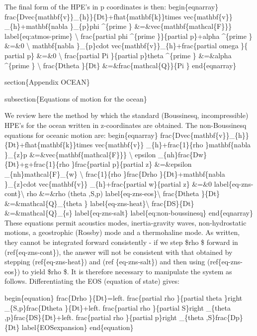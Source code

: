 \documentclass[letterpaper,10pt,english]{sphinxmanual}
\begin{document}
The final form of the HPE's in p coordinates is then:
begin\{eqnarray\}
frac\{Dvec\{mathbf\{v\}\}\_\{h\}\}\{Dt\}+fhat\{mathbf\{k\}\}times vec\{mathbf\{v\}\}
\_\{h\}+mathbf\{nabla \}\_\{p\}phi \textasciicircum{}\{prime \} \&=\&vec\{mathbf\{mathcal\{F\}\}\}
label\{eq:atmos-prime\} \textbackslash{}
frac\{partial phi \textasciicircum{}\{prime \}\}\{partial p\}+alpha \textasciicircum{}\{prime \} \&=\&0 \textbackslash{}
mathbf\{nabla \}\_\{p\}cdot vec\{mathbf\{v\}\}\_\{h\}+frac\{partial omega \}\{
partial p\} \&=\&0 \textbackslash{}
frac\{partial Pi \}\{partial p\}theta \textasciicircum{}\{prime \} \&=\&alpha \textasciicircum{}\{prime \} \textbackslash{}
frac\{Dtheta \}\{Dt\} \&=\&frac\{mathcal\{Q\}\}\{Pi \}
end\{eqnarray\}

section\{Appendix OCEAN\}

subsection\{Equations of motion for the ocean\}

We review here the method by which the standard (Boussinesq, incompressible)
HPE's for the ocean written in z-coordinates are obtained. The
non-Boussinesq equations for oceanic motion are:
begin\{eqnarray\}
frac\{Dvec\{mathbf\{v\}\}\_\{h\}\}\{Dt\}+fhat\{mathbf\{k\}\}times vec\{mathbf\{v\}\}
\_\{h\}+frac\{1\}\{rho \}mathbf\{nabla \}\_\{z\}p \&=\&vec\{mathbf\{mathcal\{F\}\}\} \textbackslash{}
epsilon \_\{nh\}frac\{Dw\}\{Dt\}+g+frac\{1\}\{rho \}frac\{partial p\}\{partial z\}
\&=\&epsilon \_\{nh\}mathcal\{F\}\_\{w\} \textbackslash{}
frac\{1\}\{rho \}frac\{Drho \}\{Dt\}+mathbf\{nabla \}\_\{z\}cdot vec\{mathbf\{v\}\}
\_\{h\}+frac\{partial w\}\{partial z\} \&=\&0 label\{eq-zns-cont\}\textbackslash{}
rho \&=\&rho (theta ,S,p) label\{eq-zns-eos\}\textbackslash{}
frac\{Dtheta \}\{Dt\} \&=\&mathcal\{Q\}\_\{theta \} label\{eq-zns-heat\}\textbackslash{}
frac\{DS\}\{Dt\} \&=\&mathcal\{Q\}\_\{s\}  label\{eq-zns-salt\}
label\{eq:non-boussinesq\}
end\{eqnarray\}
These equations permit acoustics modes, inertia-gravity waves,
non-hydrostatic motions, a geostrophic (Rossby) mode and a thermohaline
mode. As written, they cannot be integrated forward consistently - if we
step \$rho \$ forward in (ref\{eq-zns-cont\}), the answer will not be
consistent with that obtained by stepping (ref\{eq-zns-heat\}) and (ref
\{eq-zns-salt\}) and then using (ref\{eq-zns-eos\}) to yield \$rho \$. It is
therefore necessary to manipulate the system as follows. Differentiating the
EOS (equation of state) gives:

begin\{equation\}
frac\{Drho \}\{Dt\}=left. frac\{partial rho \}\{partial theta \}right\textbar{}
\_\{S,p\}frac\{Dtheta \}\{Dt\}+left. frac\{partial rho \}\{partial S\}right\textbar{}
\_\{theta ,p\}frac\{DS\}\{Dt\}+left. frac\{partial rho \}\{partial p\}right\textbar{}
\_\{theta ,S\}frac\{Dp\}\{Dt\}  label\{EOSexpansion\}
end\{equation\}
\end{document}
